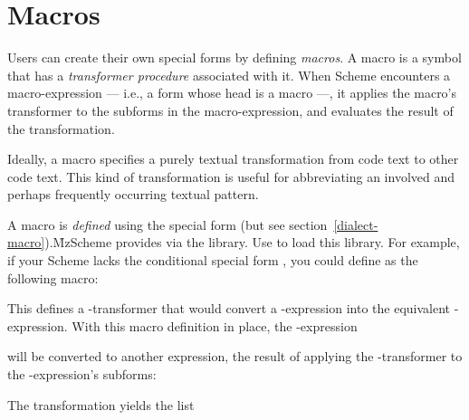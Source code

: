 
\chapter{Macros}
\label{sugar}

Users can create their own special forms by defining
{\em macros}.  A macro is a symbol that has a {\em
transformer procedure} associated with it.  When Scheme
encounters a macro-expression — i.e., a form whose
head is a macro —, it applies the macro’s transformer
to the subforms in the macro-expression, and evaluates
the result of the transformation.

Ideally, a macro specifies a purely textual
transformation from code text to other code text.  This
kind of transformation is useful for abbreviating an
involved and perhaps frequently occurring textual
pattern.



A macro is {\em defined} using the special form
 (but see
section~\ref{dialect-macro}).\f{MzScheme provides
 via the  library.  Use  to load this library.}
For example, if your Scheme lacks the conditional
special form , you could define
 as the following macro:



\n This defines a  -transformer that would
convert a -expression into the equivalent
-expression.   With this macro definition in
place, the -expression 


\n will be converted to another expression, the result
of applying the
-transformer to the -expression’s
subforms:


\n The transformation yields the list

